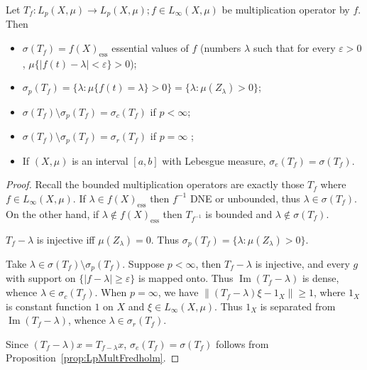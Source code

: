 \begin{proposition}
	Let $T_f: L_p(X, \mu) \to L_p(X, \mu); f \in L_\infty (X, \mu)$ be multiplication operator by $f$. Then
	\begin{itemize}
		\item $\sigma(T_f) = f(X) _{\text{ess}}$ essential values of $f$ (numbers $\lambda$ such that for every $\varepsilon>0$, $\mu \{|f(t) - \lambda| < \varepsilon\}  > 0$);
		\item $\sigma_p(T_f) = \{\lambda: \mu \{f(t) = \lambda\} > 0\} = \{\lambda: \mu(Z_\lambda) > 0\} $;
		\item $\sigma(T_f) \setminus \sigma_p(T_f) = \sigma_c(T_f)$ if $p < \infty $;
		\item $\sigma(T_f) \setminus \sigma_p(T_f) = \sigma_r(T_f)$ if $p = \infty $ ;
		\item If $(X, \mu)$ is an interval $[a,b]$ with Lebesgue measure, $\sigma_e(T_f) = \sigma(T_f)$.
	\end{itemize}
\end{proposition}
\begin{proof}
	
	Recall the bounded multiplication operators are exactly those $T_f$ where $f \in L_\infty (X, \mu)$. If $\lambda \in f(X)_{\text{ess}}$ then $f^{-1}$ DNE or unbounded, thus $\lambda \in \sigma(T_f)$. On the other hand, if $\lambda \not\in f(X)_{\text{ess}}$ then $T_{f^{-1}}$ is bounded and $\lambda \not\in \sigma(T_f)$.

	$T_f - \lambda$ is injective iff $\mu(Z_\lambda) = 0$. Thus $\sigma_p(T_f) = \{\lambda: \mu(Z_\lambda) > 0\} $.

	Take $\lambda \in \sigma(T_f) \setminus \sigma_p(T_f)$. Suppose $p < \infty $, then $T_f - \lambda$ is injective, and  every $g$ with support on $\{|f - \lambda| \ge \varepsilon\} $ is mapped onto. Thus $\operatorname{Im} (T_f - \lambda)$ is dense, whence $\lambda \in \sigma_c(T_f)$. When $p = \infty $, we have $\|(T_f - \lambda) \xi - 1_X\| \ge 1$, where $1_X$ is constant function $1$ on $X$ and $\xi \in L_\infty(X, \mu)$. Thus $1_X$ is separated from $\operatorname{Im} (T_f - \lambda)$, whence $\lambda \in \sigma_r(T_f)$.

	Since $(T_f - \lambda) x = T_{f - \lambda}x$, $\sigma_e(T_f) = \sigma(T_f)$ follows from Proposition~\ref{prop:LpMultFredholm}.
\end{proof}


